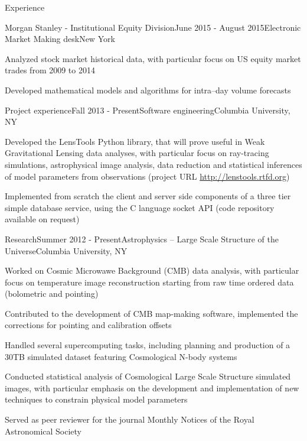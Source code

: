 \documentclass{resume} %
\begin{document}
\begin{rSection}{Experience}

\begin{rSubsection}{Morgan Stanley - Institutional Equity Division}{June 2015 - August 2015}{Electronic Market Making desk}{New York}
\item Analyzed stock market historical data, with particular focus on US equity market trades from 2009 to 2014
\item Developed mathematical models and algorithms for intra--day volume forecasts 
\end{rSubsection}

\begin{rSubsection}{Project experience}{Fall 2013 - Present}{Software engineering}{Columbia University, NY}
\item Developed the LensTools Python library, that will prove useful in Weak Gravitational Lensing data analyses, with particular focus on ray-tracing simulations, astrophysical image analysis, data reduction and statistical inferences of model parameters from observations (project URL \url{http://lenstools.rtfd.org})
\item Implemented from scratch the client and server side components of a three tier simple database service, using the C language socket API (code repository available on request)
\end{rSubsection}


\begin{rSubsection}{Research}{Summer 2012 - Present}{Astrophysics -- Large Scale Structure of the Universe}{Columbia University, NY}
\item Worked on Cosmic Microwawe Background (CMB) data analysis, with particular focus on temperature image reconstruction starting from raw time ordered data (bolometric and pointing) 
\item Contributed to the development of CMB map-making software, implemented the corrections for pointing and calibration offsets
\item Handled several supercomputing tasks, including planning and production of a 30TB simulated dataset featuring Cosmological N-body systems
\item Conducted statistical analysis of Cosmological Large Scale Structure simulated images, with particular emphasis on the development and implementation of new techniques to constrain physical model parameters
\item Served as peer reviewer for the journal Monthly Notices of the Royal Astronomical Society
\end{rSubsection}


\end{rSection}
\end{document}
